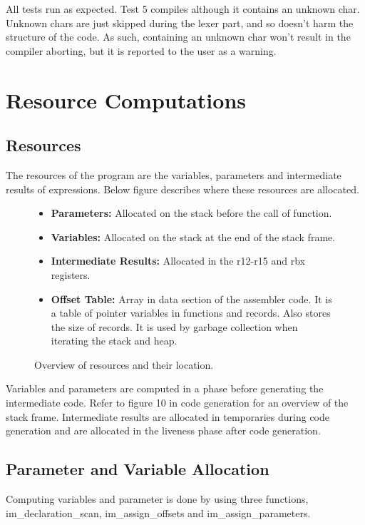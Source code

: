 \documentclass{article}
\begin{document}
All tests run as expected. Test 5 compiles although it contains an unknown char. Unknown chars are just skipped during the lexer part, and so doesn't harm the structure of the code. As such, containing an unknown char won't result in the compiler aborting, but it is reported to the user as a warning.

\section{Resource Computations}
\subsection{Resources}
The resources of the program are the variables, parameters and intermediate results of expressions. Below figure describes where these resources are allocated.
\begin{figure}[h]
    \begin{itemize}
        \item[] \textbf{Parameters: } Allocated on the stack before the call of function.
        \item[] \textbf{Variables: } Allocated on the stack at the end of the stack frame.
        \item[] \textbf{Intermediate Results: } Allocated in the r12-r15 and rbx registers.
        \item[] \textbf{Offset Table: } Array in data section of the assembler code. It is a table of pointer variables in functions and records. Also stores the size of records. It is used by garbage collection when iterating the stack and heap.
    \end{itemize}
    \caption{Overview of resources and their location.}
    \label{fig:my_label}
\end{figure}

 Variables and parameters are computed in a phase before generating the intermediate code. Refer to figure 10 in code generation for an overview of the stack frame. Intermediate results are allocated in temporaries during code generation and are allocated in the liveness phase after code generation.

\subsection{Parameter and Variable Allocation}
Computing variables and parameter is done by using three functions, im\_declaration\_scan, im\_assign\_offsets and im\_assign\_parameters. 
\end{document}
